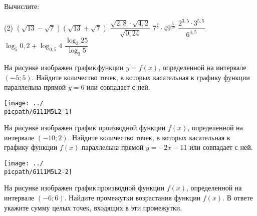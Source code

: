 
\begin{class}[number=1]
	\begin{listofex}
		\item Вычислите:
		\begin{tasks}(2)
			\task \( (\sqrt{13}-\sqrt{7})(\sqrt{13}+\sqrt{7}) \)
			\task \( \dfrac{ \sqrt{2,8} \cdot \sqrt{4,2} }{ \sqrt{0,24} } \)
			\task \( 7^{\tfrac{ 4 }{ 9 }} \cdot 49^{\tfrac{ 5 }{ 18 }} \)
			\task \( \dfrac{ 2^{3,5} \cdot 3^{5,5} }{ 6^{4,5} } \)
			\task \( \log_5 0,2 + \log_{0,5}4 \)
			\task \( \dfrac{ \log_3 25 }{ \log_3 5 } \)
		\end{tasks}
		\item
		\begin{minipage}[t]{0.45\linewidth}
			На рисунке изображен график функции \( y = f(x)\), определенной на интервале \((-5; 5)\). Найдите количество точек, в которых касательная к графику функции параллельна прямой \(y  =  6\) или совпадает с ней.
		\end{minipage}
		\hspace{0.02\linewidth}
		\begin{minipage}[t]{0.5\linewidth}
			\texttt{[image: ../\\picpath/G111M5L2-1]}
		\end{minipage}
		\item
		\begin{minipage}[t]{0.45\linewidth}
			На рисунке изображен график производной функции \(f(x)\), определенной на интервале \((-10; 2)\). Найдите количество точек, в которых касательная к графику функции \(f(x)\) параллельна прямой \(y = -2x - 11\) или совпадает с ней.
		\end{minipage}
		\hspace{0.02\linewidth}
		\begin{minipage}[t]{0.5\linewidth}
			\texttt{[image: ../\\picpath/G111M5L2-2]}
		\end{minipage}
		\item
		\begin{minipage}[t]{0.45\linewidth}
			На рисунке изображен график производной функции \(f(x)\), определенной на интервале \( (-6;6) \). Найдите промежутки возрастания функции \(f(x)\). В ответе укажите сумму целых точек, входящих в эти промежутки.
		\end{minipage}
		\hspace{0.02\linewidth}
		\begin{minipage}[t]{0.5\linewidth}

\end{minipage}
\end{listofex}
\end{class}
